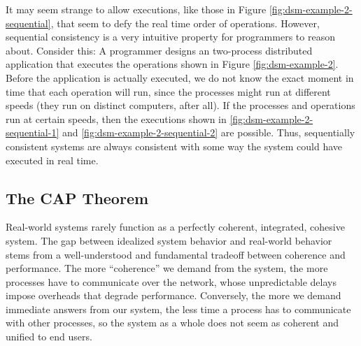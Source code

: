 \documentclass[]             %
{NASA}                       %
\theoremstyle{definition}
\begin{document}
It may seem strange to allow executions, like those in Figure
\ref{fig:dsm-example-2-sequential}, that seem to defy the real time
order of operations. However, sequential consistency is a very
intuitive property for programmers to reason about. Consider this: A
programmer designs an two-process distributed application that
executes the operations shown in Figure
\ref{fig:dsm-example-2}. Before the application is actually executed,
we do not know the exact moment in time that each operation will run,
since the processes might run at different speeds (they run on
distinct computers, after all). If the processes and operations run at
certain speeds, then the executions shown in
\ref{fig:dsm-example-2-sequential-1} and
\ref{fig:dsm-example-2-sequential-2} are possible. Thus,
sequentially consistent systems are always consistent with some way
the system could have executed in real time.

\subsection{The CAP Theorem}
Real-world systems rarely function as a perfectly coherent,
integrated, cohesive system. The gap between idealized system behavior
and real-world behavior stems from a well-understood and fundamental
tradeoff between coherence and performance. The more ``coherence'' we
demand from the system, the more processes have to communicate over
the network, whose unpredictable delays impose overheads that degrade
performance. Conversely, the more we demand immediate answers from our
system, the less time a process has to communicate with other
processes, so the system as a whole does not seem as coherent and
unified to end users.
\end{document}
